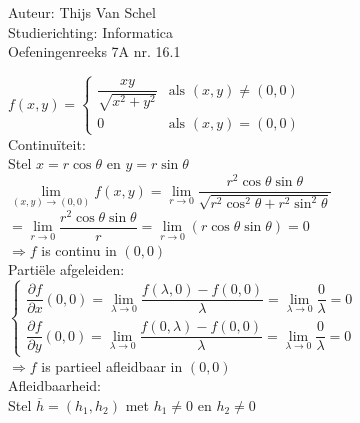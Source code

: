 \documentclass[a4paper]{article}
\newcommand{\dlim}{\lim\limits}
\begin{document}
  
\noindent \large Auteur: Thijs Van Schel \\
\noindent \large Studierichting: Informatica\\
\noindent \large Oefeningenreeks 7A nr. 16.1\\

\medskip

\normalsize

$f(x,y) = 
\left\{ 
\begin{array}{ll} 
\dfrac{xy}{\sqrt{x^2+y^2}} & \text{als } (x,y) \neq (0,0)\\[2ex] 
0 & \text{als } (x,y) = (0,0) 
\end{array} 
\right.$ \\

Continuïteit:\\

Stel $x = r\cos\theta$ en $y = r \sin \theta$\\

$\dlim_{(x,y)\rightarrow (0,0)} f(x,y) = \dlim_{r\rightarrow 0} \dfrac{r^2 \cos \theta \sin \theta}{\sqrt{r^2 \cos^2 \theta + r^2 \sin^2 \theta}}$\\

$ =\dlim_{r\rightarrow 0} \dfrac{r^2 \cos \theta \sin \theta}{r} = \dlim_{r\rightarrow 0} (r \cos \theta \sin \theta) = 0$ \\

$\Rightarrow f$ is continu in $(0,0)$ \\

Partiële afgeleiden:\\

$\left\{ 
\begin{array}{l} 
\dfrac{\partial f}{\partial x}(0,0) = \dlim_{\lambda \rightarrow 0} \dfrac{f(\lambda,0) - f(0,0)}{\lambda} = \dlim_{\lambda \rightarrow 0} \dfrac{0}{\lambda} = 0 \\[3ex] 
\dfrac{\partial f}{\partial y}(0,0) = \dlim_{\lambda \rightarrow 0} \dfrac{f(0,\lambda) - f(0,0)}{\lambda} = \dlim_{\lambda \rightarrow 0} \dfrac{0}{\lambda} = 0 
\end{array} 
\right.$ \\

$\Rightarrow f$ is partieel afleidbaar in $(0,0)$\\

Afleidbaarheid:\\

Stel $\overline{h} = (h_1,h_2)$ met $h_1 \neq 0$ en $h_2 \neq 0$\\
\end{document}
